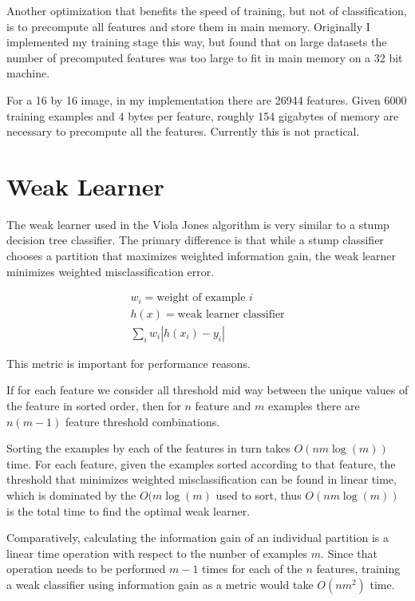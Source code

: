 \documentclass[11pt,twocolumn]{article}
\begin{document}
Another optimization that benefits the speed of training, but not of
classification, is to precompute all features and store them in main
memory. Originally I implemented my training stage this way, but found
that on large datasets the number of precomputed features was too
large to fit in main memory on a 32 bit machine.

For a 16 by 16 image, in my implementation there are 26944
features. Given 6000 training examples and 4 bytes per feature,
roughly 154 gigabytes of memory are necessary to precompute all the
features. Currently this is not practical.

\section{Weak Learner}
\label{sec:weaklearner}

The weak learner used in the Viola Jones algorithm is very similar to
a stump decision tree classifier. The primary difference is that while
a stump classifier chooses a partition that maximizes weighted
information gain, the weak learner minimizes weighted
misclassification error.

\begin{align*}
  w_i = \mbox{weight of example $i$}\\
  h(x) = \mbox{weak learner classifier}\\
  \sum_i w_i |h(x_i) - y_i|
\end{align*}

This metric is important for performance reasons.

If for each feature we consider all threshold mid way between the
unique values of the feature in sorted order, then for $n$ feature and
$m$ examples there are $n (m - 1)$ feature threshold combinations.

Sorting the examples by each of the features in turn takes $O(n m
\log(m))$ time. For each feature, given the examples sorted according
to that feature, the threshold that minimizes weighted
misclassification can be found in linear time, which is dominated by
the $O(m \log(m)$ used to sort, thus $O(n m \log(m))$ is the total
time to find the optimal weak learner.

Comparatively, calculating the information gain of an individual
partition is a linear time operation with respect to the number of
examples $m$. Since that operation needs to be performed $m - 1$ times
for each of the $n$ features, training a weak classifier using
information gain as a metric would take $O(n m^2)$ time.
\end{document}
